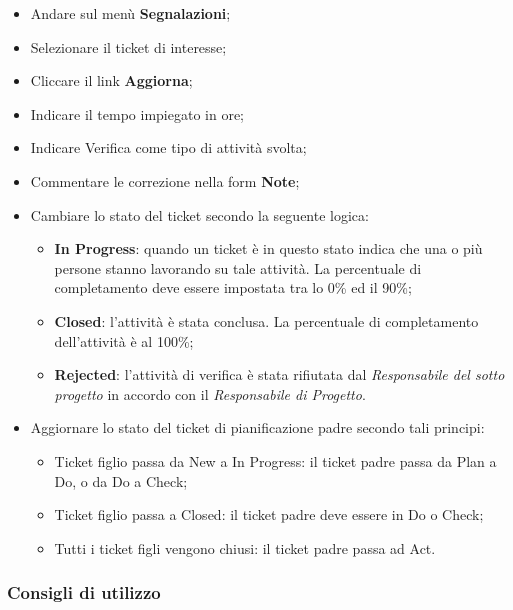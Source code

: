 \begin{itemize}
\item Andare sul menù \textbf{Segnalazioni}; 
\item Selezionare il ticket di interesse; 
\item Cliccare il link \textbf{Aggiorna}; 
\item Indicare il tempo impiegato in ore; 
\item Indicare Verifica come tipo di attività svolta; 
\item Commentare le correzione nella form \textbf{Note}; 
\item Cambiare lo stato del ticket secondo la seguente logica:
		\begin{itemize}
		\item \textbf{In Progress}: quando un ticket è in questo stato indica che una o più persone 
		stanno lavorando su tale attività. La percentuale di completamento deve 
		essere impostata tra lo 0\% ed il 90\%; 
		\item \textbf{Closed}: l’attività è stata conclusa. La percentuale di completamento dell’attività è al 100\%; 
		\item \textbf{Rejected}: l’attività di verifica è stata rifiutata dal \emph{Responsabile del sotto progetto} in accordo con il \emph{Responsabile di Progetto}. 
		
		\end{itemize}

\item Aggiornare lo stato del ticket di pianificazione padre secondo tali principi:
		\begin{itemize}
		\item Ticket figlio passa da New a In Progress: il ticket padre passa da Plan a Do, 
		o da Do a Check; 
		\item Ticket figlio passa a Closed: il ticket padre deve essere in Do o Check; 
		\item Tutti i ticket figli vengono chiusi: il ticket padre passa ad Act. 
		
		\end{itemize} 

\end{itemize} 




\subsubsection{Consigli di utilizzo}
 
